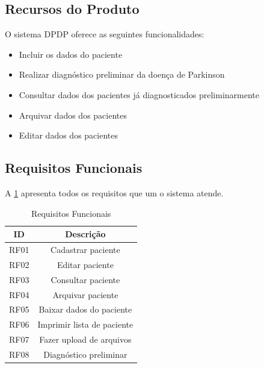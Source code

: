 \begin{anexosenv}
    \subsection{Recursos do Produto}

    O sistema DPDP oferece as seguintes funcionalidades:

    \begin{itemize}
        \item Incluir os dados do paciente
        \item Realizar diagnóstico preliminar da doença de Parkinson
        \item Consultar dados dos pacientes já diagnosticados preliminarmente
        \item Arquivar dados dos pacientes
        \item Editar dados dos pacientes
    \end{itemize}

    \subsection{Requisitos Funcionais}

    A \ref{table:Requisitos Funcionais} apresenta todos os requisitos que um o sistema atende.

    \begin{table}[ht!]
        \centering
        \caption{Requisitos Funcionais}
        \begin{tabular}{@{}|c|c|@{}}
            \hline
            \textbf{ID} & \textbf{Descrição}         \\ \hline
            RF01        & Cadastrar paciente         \\ \hline
            RF02        & Editar paciente            \\ \hline
            RF03        & Consultar paciente         \\ \hline
            RF04        & Arquivar paciente          \\ \hline
            RF05        & Baixar dados do paciente   \\ \hline
            RF06        & Imprimir lista de paciente \\ \hline
            RF07        & Fazer upload de arquivos   \\ \hline
            RF08        & Diagnóstico preliminar     \\ \hline
        \end{tabular}
        \label{table:Requisitos Funcionais}
    \end{table}


\end{anexosenv}